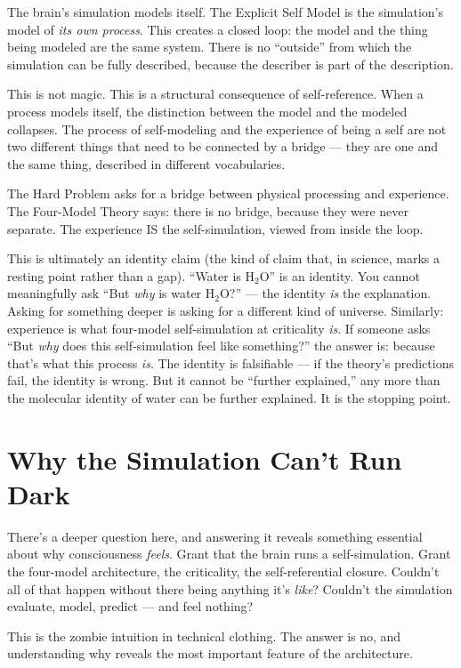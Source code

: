\documentclass[11pt, twoside, openright]{book}
\begin{document}
The brain's simulation models itself. The Explicit Self Model is the simulation's model of \textit{its own process}. This creates a closed loop: the model and the thing being modeled are the same system. There is no ``outside'' from which the simulation can be fully described, because the describer is part of the description.

This is not magic. This is a structural consequence of self-reference. When a process models itself, the distinction between the model and the modeled collapses. The process of self-modeling and the experience of being a self are not two different things that need to be connected by a bridge --- they are one and the same thing, described in different vocabularies.

The Hard Problem asks for a bridge between physical processing and experience. The Four-Model Theory says: there is no bridge, because they were never separate. The experience IS the self-simulation, viewed from inside the loop.

This is ultimately an identity claim (the kind of claim that, in science, marks a resting point rather than a gap). ``Water is H$_2$O'' is an identity. You cannot meaningfully ask ``But \textit{why} is water H$_2$O?'' --- the identity \textit{is} the explanation. Asking for something deeper is asking for a different kind of universe. Similarly: experience is what four-model self-simulation at criticality \textit{is}. If someone asks ``But \textit{why} does this self-simulation feel like something?'' the answer is: because that's what this process \textit{is}. The identity is falsifiable --- if the theory's predictions fail, the identity is wrong. But it cannot be ``further explained,'' any more than the molecular identity of water can be further explained. It is the stopping point.

\section*{Why the Simulation Can't Run Dark}

There's a deeper question here, and answering it reveals something essential about why consciousness \textit{feels}. Grant that the brain runs a self-simulation. Grant the four-model architecture, the criticality, the self-referential closure. Couldn't all of that happen without there being anything it's \textit{like}? Couldn't the simulation evaluate, model, predict --- and feel nothing?

This is the zombie intuition in technical clothing. The answer is no, and understanding why reveals the most important feature of the architecture.
\end{document}
